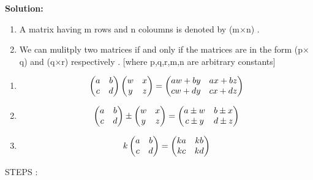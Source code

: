 \documentclass[journal,12pt,twocolumn]{IEEEtran}
\begin{document}
\textbf{Solution:}
       \begin{enumerate}
 \item A matrix having m rows and n coloumns is denoted by
               (m$\times$n) .
  
 \item We can mulitply two matrices if and only if the matrices are 
       in the form (p$\times$q) and (q$\times$r) respectively .
       [where p,q,r,m,n are arbitrary constants]
       \end{enumerate}
       \begin{enumerate}[label=(\roman*)]
 \item \begin{align}
       \label{eq:2} 
       \begin{pmatrix}a & b \\c & d \end{pmatrix} \begin{pmatrix}w & x \\y & z \end{pmatrix} = 
       \begin{pmatrix}aw+ by & ax+ bz \\cw+ dy& cx+ dz\end{pmatrix} 
       \end{align}
 \item \begin{align}
       \label{eq:3}
       \begin{pmatrix}a & b \\c & d \end{pmatrix} 
       \pm \begin{pmatrix}w & x \\y & z \end{pmatrix} =
       \begin{pmatrix}a\pm w & b\pm x \\c\pm y& d\pm z\end{pmatrix} 
       \end{align}
 \item \begin{align}
       \label{eq:4}
       k\begin{pmatrix}a & b \\c & d \end{pmatrix} =
       \begin{pmatrix}ka & kb \\kc & kd \end{pmatrix} 
       \end{align}
       \end{enumerate} 
       STEPS :
\end{document}
